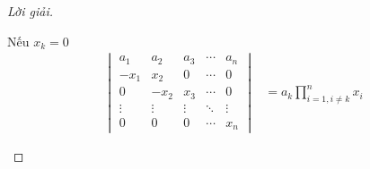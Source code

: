 \begin{proof}[Lời giải]
\begin{enumerate}[label = (\alph*)]
              Nếu $x_{k} = 0$
              \begin{align*}
                  \begin{vmatrix}
                      a_{1}  & a_{2}  & a_{3}  & \cdots & a_{n}  \\
                      -x_{1} & x_{2}  & 0      & \cdots & 0      \\
                      0      & -x_{2} & x_{3}  & \cdots & 0      \\
                      \vdots & \vdots & \vdots & \ddots & \vdots \\
                      0      & 0      & 0      & \cdots & x_{n}
                  \end{vmatrix}
                   & = a_{k}\prod^{n}_{i=1,i\ne k} x_{i}
              \end{align*}
              

\end{enumerate}
\end{proof}
